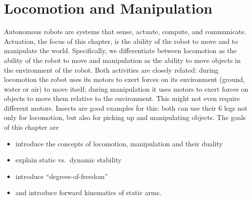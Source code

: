 \chapter{Locomotion and Manipulation}\label{chap:locomotion}
Autonomous robots are systems that sense, actuate, compute, and communicate. Actuation, the focus of this chapter, is the ability of the robot to move and to manipulate the world. Specifically, we differentiate between locomotion as the ability of the robot to move and manipulation as the ability to move objects in the environment of the robot. Both activities are closely related: during locomotion the robot uses its motors to exert forces on its environment (ground, water or air) to move itself; during manipulation it uses motors to exert forces on objects to move them relative to the environment. This might not even require different motors. Insects are good examples for this: both can use their 6 legs not only for locomotion, but also for picking up and manipulating objects. The goals of this chapter are
\begin{itemize}
\item introduce the concepts of locomotion, manipulation and their duality
\item explain static vs.\ dynamic stability
\item introduce ``degrees-of-freedom''
\item and introduce forward kinematics of static arms.
\end{itemize}

